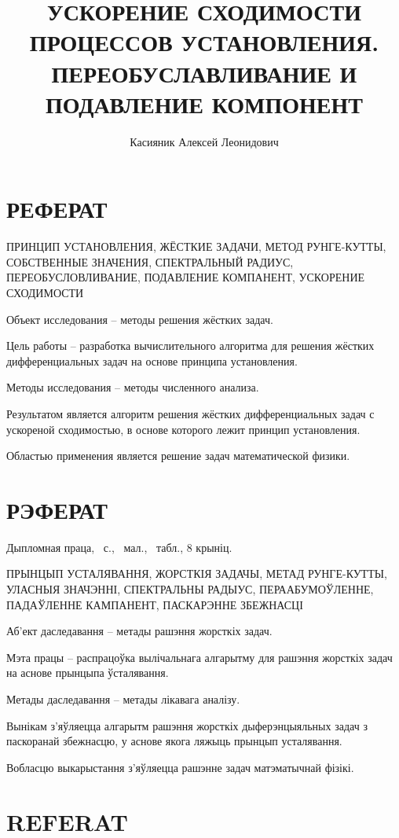 \documentclass[a4paper,14pt]{extreport}
\title{УСКОРЕНИЕ СХОДИМОСТИ ПРОЦЕССОВ УСТАНОВЛЕНИЯ. ПЕРЕОБУСЛАВЛИВАНИЕ И ПОДАВЛЕНИЕ КОМПОНЕНТ}
\author{Касияник Алексей Леонидович}
\begin{document}
  \maketitle
  
  \setcounter{page}{2}
\newpage
\chapter*{РЕФЕРАТ}


ПРИНЦИП УСТАНОВЛЕНИЯ, ЖЁСТКИЕ ЗАДАЧИ, МЕТОД РУНГЕ-КУТТЫ, СОБСТВЕННЫЕ ЗНАЧЕНИЯ, СПЕКТРАЛЬНЫЙ РАДИУС, ПЕРЕОБУСЛОВЛИВАНИЕ, ПОДАВЛЕНИЕ КОМПАНЕНТ, УСКОРЕНИЕ СХОДИМОСТИ

Объект исследования – методы решения жёстких задач.

Цель работы – разработка вычислительного алгоритма для решения жёстких дифференциальных задач на основе принципа установления.

Методы исследования – методы численного анализа.%

Результатом является алгоритм решения жёстких дифференциальных задач с ускореной сходимостью, в основе которого лежит принцип установления.

Областью применения является решение задач математической физики.

\chapter*{РЭФЕРАТ}

Дыпломная праца, \pageref{LastPage}~с., \totfig~мал., \tottab~табл., 8 крыніц.

ПРЫНЦЫП УСТАЛЯВАННЯ, ЖОРСТКІЯ ЗАДАЧЫ, МЕТАД РУНГЕ-КУТТЫ, УЛАСНЫЯ ЗНАЧЭННІ, СПЕКТРАЛЬНЫ РАДЫУС, ПЕРААБУМОЎЛЕННЕ, ПАДАЎЛЕННЕ КАМПАНЕНТ, ПАСКАРЭННЕ ЗБЕЖНАСЦІ

Аб'ект даследавання – метады рашэння жорсткіх задач.

Мэта працы – распрацоўка вылічальнага алгарытму для рашэння жорсткіх задач на аснове прынцыпа ўсталявання.

Метады даследавання – метады лікавага аналізу.%

Вынікам з'яўляецца алгарытм рашэння жорсткіх дыферэнцыяльных задач з паскоранай збежнасцю, у аснове якога ляжыць прынцып усталявання.

Вобласцю выкарыстання з'яўляецца рашэнне задач матэматычнай фізікі.

\chapter*{REFERAT}
\end{document}
